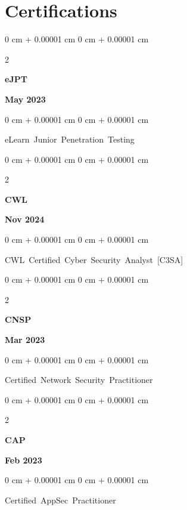 \documentclass[10pt, letterpaper]{article}
\newenvironment{onecolentry}{
    \begin{adjustwidth}{
        0 cm + 0.00001 cm
    }{
        0 cm + 0.00001 cm
    }
}{
    \end{adjustwidth}
} %
\newenvironment{twocolentry}[2][]{
    \onecolentry
    \def\secondColumn{#2}
    \setcolumnwidth{\fill, 4.5 cm}
    \begin{paracol}{2}
}{
    \switchcolumn \raggedleft \secondColumn
    \end{paracol}
    \endonecolentry
} %
\begin{document}
    
    \section{Certifications}
     \vspace{0.35 cm}
      \begin{samepage}
    	\begin{twocolentry}{\textbf{ May 2023}}
    		\textbf{eJPT }
    	\end{twocolentry}
    	
    	\vspace{0.10 cm}
    	
    	\begin{onecolentry}
    		\mbox{eLearn Junior Penetration Testing} \end{onecolentry}
    \end{samepage}
    
     \vspace{0.20 cm}
    \begin{samepage}
    	\begin{twocolentry}{\textbf{ Nov 2024}}
    		\textbf{CWL}
    	\end{twocolentry}
    	
    	\vspace{0.10 cm}
    	
    	\begin{onecolentry}
    		\mbox{CWL Certified Cyber Security Analyst [C3SA]} \end{onecolentry}
    \end{samepage}
    
		 \vspace{0.20 cm}
	     \begin{samepage}
		\begin{twocolentry}{\textbf{Mar 2023}}
			\textbf{CNSP}
		\end{twocolentry}
		
		\vspace{0.10 cm}
		
		\begin{onecolentry}
			\mbox{Certified Network Security Practitioner} \end{onecolentry}
	\end{samepage}


          \vspace{0.20 cm}
        \begin{samepage}
            \begin{twocolentry}{\textbf{Feb 2023}}
                \textbf{CAP}
            \end{twocolentry}

            \vspace{0.10 cm}
            
            \begin{onecolentry}
\mbox{Certified AppSec Practitioner} \end{onecolentry}
        \end{samepage}
\end{document}
